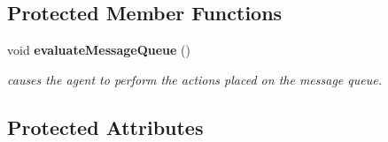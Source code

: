 \subsection*{Protected Member Functions}
\begin{CompactItemize}
\item 
void {\bf evaluateMessageQueue} ()
\begin{CompactList}\small\item\em causes the agent to perform the actions placed on the message queue. \item\end{CompactList}\end{CompactItemize}
\subsection*{Protected Attributes}
